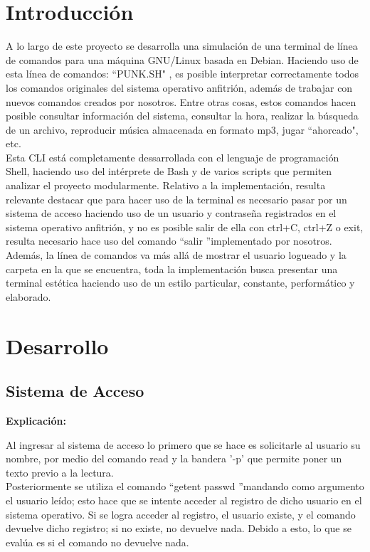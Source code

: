 \documentclass[letter,12pt]{article} %
\begin{document}
\section{Introducción}
A lo largo de este proyecto se desarrolla una simulación de una terminal de línea de comandos para una máquina GNU/Linux basada en Debian. Haciendo uso de esta línea de comandos: \textquotedblleft PUNK.SH" , es posible interpretar correctamente todos los comandos originales del sistema operativo anfitrión, además de trabajar con nuevos comandos creados por nosotros. Entre otras cosas, estos comandos hacen posible consultar información del sistema, consultar la hora, realizar la búsqueda de un archivo, reproducir música almacenada en formato mp3, jugar \textquotedblleft ahorcado", etc. \\

Esta CLI está completamente dessarrollada con el lenguaje de programación Shell, haciendo uso del intérprete de Bash y de varios scripts que permiten analizar el proyecto modularmente. Relativo a la implementación, resulta relevante destacar que para hacer uso de la terminal es necesario pasar por un sistema de acceso haciendo uso de un usuario y contraseña registrados en el sistema operativo anfitrión, y no es posible salir de ella con ctrl+C, ctrl+Z o exit, resulta necesario hace uso del comando \textquotedblleft salir \textquotedblright implementado por nosotros. Además, la línea de comandos va más allá de mostrar el usuario logueado y la carpeta en la que se encuentra, toda la implementación busca presentar una terminal estética haciendo uso de un estilo particular, constante, performático y elaborado.
\\

\section{Desarrollo}
\subsection{Sistema de Acceso}
\textbf{Explicación:} \par
\vspace{\baselineskip}
Al ingresar al sistema de acceso lo primero que se hace es solicitarle al usuario su nombre, por medio del comando read y la bandera '-p' que permite poner un texto previo a la lectura.\\
Posteriormente se utiliza el comando \textquotedblleft getent passwd \textquotedblright mandando como argumento el usuario leído; esto hace que se intente acceder al registro de dicho usuario en el sistema operativo. Si se logra acceder al registro, el usuario existe, y el comando devuelve dicho registro; si no existe, no devuelve nada. Debido a esto, lo que se evalúa es si el comando no devuelve nada.\\
\vspace{\baselineskip}
\end{document}
